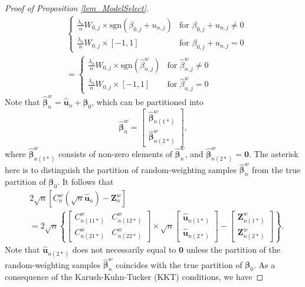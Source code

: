\documentclass[ejs,authoryear,linksfromyear]{imsart}
\newcommand{\bnw}{\widehat{\bm{\beta}}_n^w} %
\newcommand{\cnwas}{C_{n(11*)}^w}
\newcommand{\cnwbs}{C_{n(12*)}^w}
\newcommand{\cnwcs}{C_{n(21*)}^w}
\newcommand{\cnwds}{C_{n(22*)}^w}
\newcommand{\znwas}{\bm{Z}_{n(1*)}^w}
\newcommand{\znwbs}{\bm{Z}_{n(2*)}^w}
\newcommand{\hunas}{\widehat{\bm{u}}_{n(1*)}}
\newcommand{\hunbs}{\widehat{\bm{u}}_{n(2*)}}
\numberwithin{equation}{section}
\theoremstyle{plain}
\begin{document}
\begin{proof}[Proof of Proposition \ref{lem_ModelSelect}]
	 \begin{align*}
	 &\begin{cases}
	 \frac{\lambda_n}{n} W_{0,j} \times \text{sgn}
	 \left(\beta_{0,j} + u_{n,j} \right)
	 & \text{for $\beta_{0,j} + u_{n,j}  \neq 0$} \\
	 \frac{\lambda_n}{n}  W_{0,j} \times [-1,1]
	 & \text{for $\beta_{0,j} + u_{n,j}  = 0$} 
	 \end{cases} \\
	 &=\begin{cases}
	 \frac{\lambda_n}{n} W_{0,j} \times \text{sgn}
	 \left(\widehat{\beta}^w_{n,j} \right)
	 & \text{for $\widehat{\beta}^w_{n,j}  \neq 0$} \\
	 \frac{\lambda_n}{n}  W_{0,j} \times [-1,1]
	 & \text{for $\widehat{\beta}^w_{n,j}  = 0$} 
	 \end{cases}
	 \end{align*}
	 Note that $\bnw = \widehat{\bm{u}}_n + \bm{\beta}_0$, which can be partitioned into 
	 \[
	 \bnw = 
	 \begin{bmatrix}
	 \widehat{\bm{\beta}}^w_{n(1*)} \\
	 \widehat{\bm{\beta}}^w_{n(2*)} 
	 \end{bmatrix},
	 \]
	 where $\widehat{\bm{\beta}}^w_{n(1*)}$ consists of non-zero elements of $\bnw$, and $\widehat{\bm{\beta}}^w_{n(2*)} = \bm{0}$. The asterisk here is to distinguish the partition of random-weighting samples $\bnw$ from the true partition of $\bm{\beta}_0$. It follows that     
	 \begin{align*}
	 &2 \sqrt{n} 
	 \left[
	 C_n^w 
	 \left( \sqrt{n} \widehat{\bm{u}}_n \right) 
	 - \bm{Z}_n^w
	 \right] \\
	 &= 2 \sqrt{n} 
	 \left\{
	 \begin{bmatrix}
	 \cnwas & \cnwbs \\
	 \cnwcs & \cnwds 
	 \end{bmatrix}
	 \times \sqrt{n} 
	 \begin{bmatrix}
	 \hunas \\
	 \hunbs
	 \end{bmatrix} 
	 -
	 \begin{bmatrix}
	 \znwas \\
	 \znwbs
	 \end{bmatrix}
	 \right\}.
	 \end{align*}
	 Note that $\hunbs$ does not necessarily equal to $\bm{0}$ unless the partition of the random-weighting samples $\bnw$ coincides with the true partition of $\bm{\beta}_0$. As a consequence of the Karush-Kuhn-Tucker (KKT) conditions, we have 

\end{proof}
\end{document}
